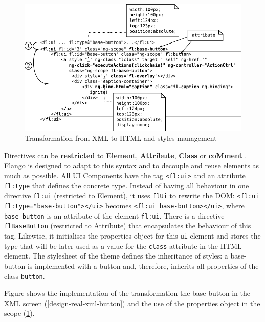 \begin{figure}
    \centering
    \includegraphics{figures/design/from-xml-to-html-3.pdf}
    \caption{Transformation from XML to HTML and styles management}
    \label{fig:design-xml-to-html-3}
\end{figure}


Directives can be \textbf{restricted} to \textbf{Element}, \textbf{Attribute}, \textbf{Class} or \textbf{coMment} .
Flango \cm is designed to adapt to this syntax and to decouple and reuse elements as much as possible.
All UI Components have the tag \lstinline$<fl:ui>$ and an attribute \lstinline$fl:type$ that defines the concrete type.
Instead of having all behaviour in one directive \texttt{fl:ui} (restricted to Element), it uses \texttt{flUi} to rewrite the \ac{DOM}: \lstinline$<fl:ui fl:type="base-button"></ui>$ becomes \lstinline$<fl:ui base-button></ui>$, where \texttt{base-button} is an attribute of the element \texttt{fl:ui}.
There is a directive \texttt{flBaseButton} (restricted to Attribute) that encapsulates the behaviour of this tag.
Likewise, it initialises the properties object for this \texttt{ui} element and stores the type that will be later used as a value for the \texttt{class} attribute in the \ac{HTML} element.
The stylesheet of the theme defines the inheritance of styles: a base-button is implemented with a button and, therefore, inherits all properties of the class \texttt{button}.

Figure  shows the implementation of the transformation the base button in the \ac{XML} screen (\ref{design-real-xml-button}) and the use of the properties object in the scope (\ref{fig:design-xml-to-html-3}).

